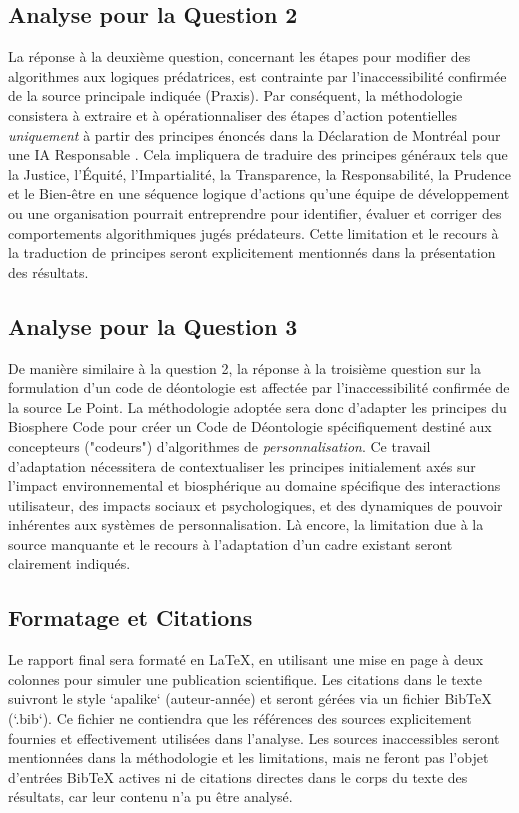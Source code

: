 \documentclass[10pt, twocolumn]{article}
\begin{document}
\subsection{Analyse pour la Question 2}
La réponse à la deuxième question, concernant les étapes pour modifier des algorithmes aux logiques prédatrices, est contrainte par l'inaccessibilité confirmée de la source principale indiquée (Praxis). Par conséquent, la méthodologie consistera à extraire et à opérationnaliser des étapes d'action potentielles \textit{uniquement} à partir des principes énoncés dans la Déclaration de Montréal pour une IA Responsable \citep{Montreal2018}. Cela impliquera de traduire des principes généraux tels que la Justice, l'Équité, l'Impartialité, la Transparence, la Responsabilité, la Prudence et le Bien-être en une séquence logique d'actions qu'une équipe de développement ou une organisation pourrait entreprendre pour identifier, évaluer et corriger des comportements algorithmiques jugés prédateurs. Cette limitation et le recours à la traduction de principes seront explicitement mentionnés dans la présentation des résultats.

\subsection{Analyse pour la Question 3}
De manière similaire à la question 2, la réponse à la troisième question sur la formulation d'un code de déontologie est affectée par l'inaccessibilité confirmée de la source Le Point. La méthodologie adoptée sera donc d'adapter les principes du Biosphere Code \citep{Biosphere2015} pour créer un Code de Déontologie spécifiquement destiné aux concepteurs ("codeurs") d'algorithmes de \textit{personnalisation}. Ce travail d'adaptation nécessitera de contextualiser les principes initialement axés sur l'impact environnemental et biosphérique au domaine spécifique des interactions utilisateur, des impacts sociaux et psychologiques, et des dynamiques de pouvoir inhérentes aux systèmes de personnalisation. Là encore, la limitation due à la source manquante et le recours à l'adaptation d'un cadre existant seront clairement indiqués.

\subsection{Formatage et Citations}
Le rapport final sera formaté en LaTeX, en utilisant une mise en page à deux colonnes pour simuler une publication scientifique. Les citations dans le texte suivront le style `apalike` (auteur-année) et seront gérées via un fichier BibTeX (`.bib`). Ce fichier ne contiendra que les références des sources explicitement fournies et effectivement utilisées dans l'analyse. Les sources inaccessibles seront mentionnées dans la méthodologie et les limitations, mais ne feront pas l'objet d'entrées BibTeX actives ni de citations directes dans le corps du texte des résultats, car leur contenu n'a pu être analysé.
\end{document}
